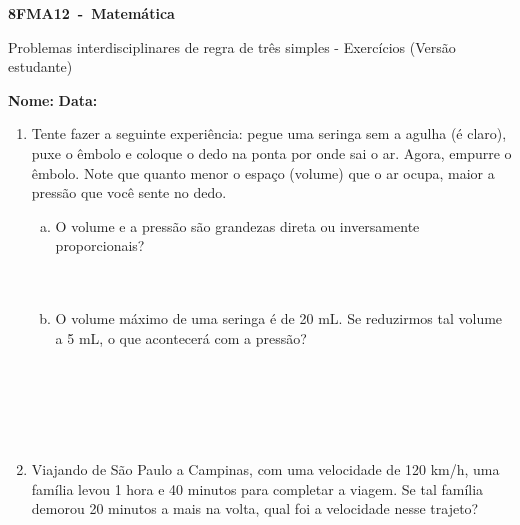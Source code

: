 \documentclass[a4paper,14pt]{article}
\begin{document}
	
	\noindent\textbf{8FMA12~-~Matemática} 
	
	\begin{center}Problemas interdisciplinares de regra de três simples - Exercícios (Versão estudante)
	\end{center}
	
	
	\noindent\textbf{Nome:} \underline{\hspace{10cm}}
	\noindent\textbf{Data:} \underline{\hspace{4cm}}
	
	\begin{multicols}{2}
		\begin{enumerate}
			\item Tente fazer a seguinte experiência: pegue uma seringa sem a agulha (é claro), puxe o êmbolo e coloque o dedo na ponta por onde sai o ar. Agora, empurre o êmbolo. Note que quanto menor o espaço (volume) que o ar ocupa, maior a pressão que você sente no dedo.
			\begin{enumerate}[a)]
				\item O volume e a pressão são grandezas direta ou inversamente proporcionais? \\\\\\
				\item O volume máximo de uma seringa é de 20 mL. Se reduzirmos tal volume a 5 mL, o que acontecerá com a pressão? \\\\\\\\\\\\
			\end{enumerate}	
		    \item Viajando de São Paulo a Campinas, com uma velocidade de 120 km/h, uma família levou 1 hora e 40 minutos para completar a viagem. Se tal família demorou 20 minutos a mais na volta, qual foi a velocidade nesse trajeto? \\\\\\\\\\\\\\\\\\\\

\end{enumerate}
\end{multicols}
\end{document}
